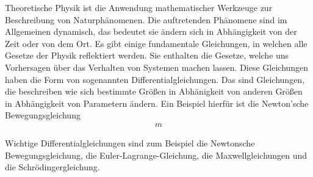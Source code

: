 Theoretische Physik ist die Anwendung mathematischer Werkzeuge zur Beschreibung von Naturphänomenen. Die auftretenden Phänomene sind im Allgemeinen dynamisch, das bedeutet sie ändern sich in Abhängigkeit von der Zeit oder von dem Ort. \newline
Es gibt einige fundamentale Gleichungen, in welchen alle Gesetze der Physik reflektiert werden.  
Sie enthalten die Gesetze, welche uns Vorhersagen über das Verhalten von Systemen machen lassen. 
Diese Gleichungen haben die Form von sogenannten Differentialgleichungen. Das sind Gleichungen, die beschreiben wie sich bestimmte Größen in Abhänigkeit von anderen Größen in Abhängigkeit von Parametern ändern. 
Ein Beispiel hierfür ist die Newton'sche Bewegungsgleichung
\begin{align}
	m
\end{align}


Wichtige Differentialgleichungen sind zum Beispiel die Newtonsche Bewegungsgleichung, die Euler-Lagrange-Gleichung, die Maxwellgleichungen und die Schrödingergleichung.

